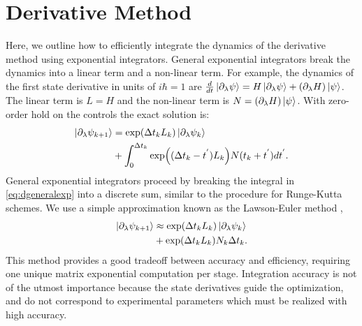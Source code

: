 \section{Derivative Method \label{appendix:derivative}}
Here, we outline how to efficiently integrate the dynamics
of the derivative method using exponential integrators.
General exponential integrators break the dynamics into a linear term and a non-linear term.
For example, the dynamics of the first state derivative in
units of $i\hbar = 1$ are $\frac{d}{dt} \ket{\partial_{\lambda} \psi} =
H \ket{\partial_{\lambda} \psi} + (\partial_{\lambda} H) \ket{\psi}$.
The linear term is $L = H$ and the non-linear term is $N = (\partial_{\lambda} H) \ket{\psi}$.
With zero-order hold on the controls the exact solution is:
\begin{equation}
  \label{eq:dgeneralexp}
  \begin{aligned}
    \ket{\partial_{\lambda} \psi_{k + 1}} &= \exp(\Delta t_{k} L_{k})
    \ket{\partial_{\lambda} \psi_{k}}\\
    &+ \int_{0}^{\Delta t_{k}} \exp((\Delta t_{k} - t^{'})L_{k})
    N(t_{k} + t^{'}) dt^{'}.\\
  \end{aligned}
\end{equation}
General exponential integrators proceed by breaking the integral in \eqref{eq:dgeneralexp}
into a discrete sum, similar to the procedure
for Runge-Kutta schemes. We use a simple approximation known as the Lawson-Euler
method \cite{berland2005solving},
\begin{equation}
  \begin{aligned}
    \ket{\partial_{\lambda} \psi_{k + 1}} &\approx \exp(\Delta t_{k}L_{k}) \ket{\partial_{\lambda} \psi_{k}}\\
    &+ \exp(\Delta t_{k}L_{k}) N_{k} \Delta t_{k}.\\
  \end{aligned}
\end{equation}
This method provides a good tradeoff between accuracy and efficiency, requiring one unique matrix
exponential computation per stage. Integration accuracy is not of the utmost importance because the
state derivatives guide the optimization, and do not correspond to experimental parameters
which must be realized with high accuracy.




